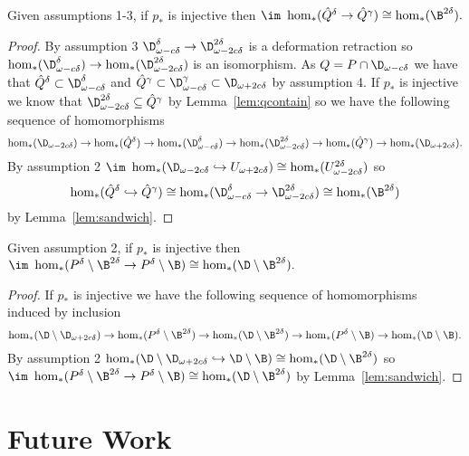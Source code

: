 \begin{lemma}
    Given assumptions 1-3, if $p_*$ is injective then $\im~\hom_*(\hat{Q}^\delta \to \hat{Q}^{\gamma})\cong \hom_*(\B^{2\delta}).$
\end{lemma}
\begin{proof}
    By assumption 3 $\D_{\omega-c\delta}^\delta\to \D_{\omega-2c\delta}^{2\delta}$ is a deformation retraction so $\hom_*(\D_{\omega-c\delta}^\delta)\to \hom_*(\D_{\omega-2c\delta}^{2\delta})$ is an isomorphism.
    As $Q = P\cap \D_{\omega-c\delta}$ we have that $\hat{Q}^\delta\subset \D_{\omega-c\delta}^\delta$ and $\hat{Q}^\gamma\subset\D_{\omega - c\delta}^\gamma\subset \D_{\omega + 2c\delta}$ by assumption 4.
    If $p_*$ is injective we know that $\D_{\omega - 2c\delta}^{2\delta}\subseteq \hat{Q}^\gamma$ by Lemma~\ref{lem:qcontain} so we have the following sequence of homomorphisms
    \[ \hom_*(\D_{\omega - 2c\delta})\to \hom_*(\hat{Q}^\delta)\to \hom_*(\D_{\omega-c\delta}^\delta)\to \hom_*(\D_{\omega - 2c\delta}^{2\delta})\to\hom_*(\hat{Q}^\gamma)\to\hom_*(\D_{\omega + 2c\delta}).\]
    By assumption 2 $\im~\hom_*(\D_{\omega - 2c\delta}\hookrightarrow U_{\omega+2c\delta})\cong\hom_*(U_{\omega-2c\delta}^{2\delta})$ so \[\hom_*(\hat{Q}^\delta\hookrightarrow\hat{Q}^\gamma)\cong\hom_*(\D_{\omega-c\delta}^\delta\to \D_{\omega-2c\delta}^{2\delta})\cong \hom_*(\B^{2\delta})\] by Lemma~\ref{lem:sandwich}.
\end{proof}

\begin{lemma}
    Given assumption 2, if $p_*$ is injective then $\im~\hom_*(P^\delta\setminus \B^{2\delta} \to P^\delta\setminus \B)\cong \hom_*(\D\setminus\B^{2\delta}).$
\end{lemma}
\begin{proof}
    If $p_*$ is injective we have the following sequence of homomorphisms induced by inclusion
    \[\hom_*(\D\setminus\D_{\omega+2c\delta})\to\hom_*(P^\delta\setminus \B^{2\delta})\to\hom_*(\D\setminus\B^{2\delta})\to\hom_*(P^\delta\setminus \B)\to\hom_*(\D\setminus\B).\]
    By assumption 2 $\hom_*(\D\setminus\D_{\omega+2c\delta}\hookrightarrow \D\setminus\B)\cong\hom_*(\D\setminus\B^{2\delta})$ so $\im~\hom_*(P^\delta\setminus \B^{2\delta} \to P^\delta\setminus\B)\cong \hom_*(\D\setminus\B^{2\delta})$ by Lemma~\ref{lem:sandwich}.
\end{proof}


\section{Future Work}

